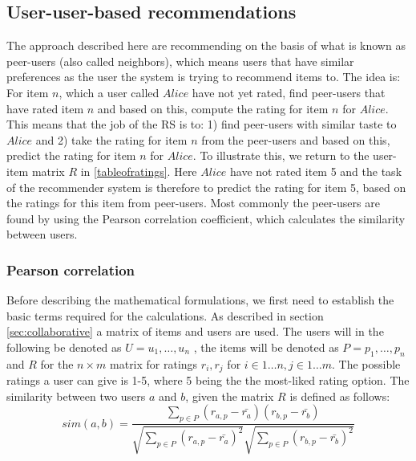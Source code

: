 \subsection{User-user-based recommendations} %
\label{sub:user_user_based_recommendations}
The approach described here are recommending on the basis of what is known as peer-users (also called neighbors), which means users that have similar preferences as the user the system is trying to recommend items to. The idea is: For item \(n\), which a user called \(Alice\) have not yet rated, find peer-users that have rated item \(n\) and based on this, compute the rating for item \(n\) for \(Alice\). This means that the job of the RS is to: 1) find peer-users with similar taste to \(Alice\) and 2) take the rating for item \(n\) from the peer-users and based on this, predict the rating for item \(n\) for \(Alice\).\newline
To illustrate this, we return to the user-item matrix \(R\) in \ref{tableofratings}. Here \(Alice\) have not rated item 5 and the task of the recommender system is therefore to predict the rating for item 5, based on the ratings for this item from peer-users. Most commonly the peer-users are found by using the Pearson correlation coefficient\citep{IntroductionRecommenderSystems}, which calculates the similarity between users.

\subsubsection{Pearson correlation}
Before describing the mathematical formulations, we first need to establish the basic terms required for the calculations. As described in section \ref{sec:collaborative} a matrix of items and users are used. The users will in the following be denoted as \( U = {u_{1}, \ldots , u_{n}} \) , the items will be denoted as \( P = {p_{1}, \ldots , p_{n}} \) and \(R\) for the \({n \times m}\) matrix for ratings \(r_{i}, r_{j}\) for \(i \in 1 \ldots n, j \in 1 \ldots m\). The possible ratings a user can give is 1-5, where 5 being the the most-liked rating option. 
The similarity between two users \(a\) and \(b\), given the matrix \(R\) is defined as follows:\\

\[
	sim(a,b) = \frac{\sum_{p\in P} (r_{a,p} - \bar{r_{a}})(r_{b,p} - \bar{r_{b}})}{\sqrt{\sum_{p\in P} (r_{a,p} - \bar{r_{a}})^2} \sqrt{\sum_{p\in P} (r_{b,p} - \bar{r_{b}})^2}}
\]


